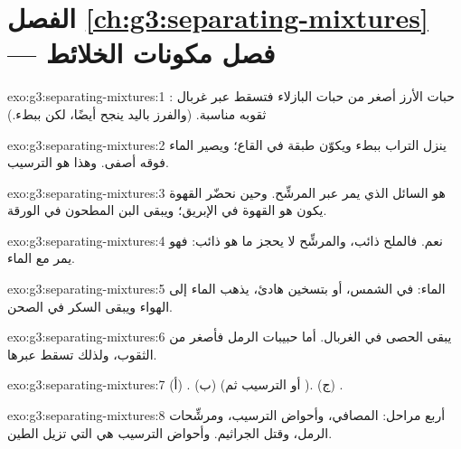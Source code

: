 \section*{الفصل \ref{ch:g3:separating-mixtures} --- فصل مكونات الخلائط}

\begin{solution}{exo:g3:separating-mixtures:1}
: حبات الأرز أصغر من حبات البازلاء فتسقط عبر غربال ثقوبه
مناسبة. (والفرز باليد ينجح أيضًا، لكن ببطء.)
\end{solution}

\begin{solution}{exo:g3:separating-mixtures:2}
ينزل التراب ببطء ويكوّن طبقة في القاع؛ ويصير الماء فوقه أصفى. وهذا
هو الترسيب.
\end{solution}

\begin{solution}{exo:g3:separating-mixtures:3}
 هو السائل الذي يمر عبر المرشِّح. وحين نحضّر القهوة يكون  هو
القهوة في الإبريق؛ ويبقى البن المطحون في
الورقة.
\end{solution}

\begin{solution}{exo:g3:separating-mixtures:4}
نعم. فالملح ذائب، والمرشِّح لا يحجز ما هو ذائب: فهو يمر مع
الماء.
\end{solution}

\begin{solution}{exo:g3:separating-mixtures:5}
 الماء: في الشمس، أو بتسخين هادئ، يذهب الماء إلى الهواء ويبقى
السكر في الصحن.
\end{solution}

\begin{solution}{exo:g3:separating-mixtures:6}
يبقى الحصى في الغربال. أما حبيبات الرمل فأصغر من الثقوب، ولذلك
تسقط عبرها.
\end{solution}

\begin{solution}{exo:g3:separating-mixtures:7}
(أ) . (ب)  (أو الترسيب ثم ). (ج) .
\end{solution}

\begin{solution}{exo:g3:separating-mixtures:8}
أربع مراحل: المصافي، وأحواض الترسيب، ومرشِّحات الرمل، وقتل الجراثيم.
وأحواض الترسيب هي التي تزيل الطين.
\end{solution}

